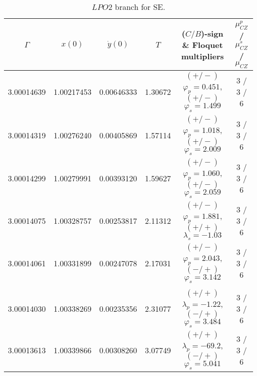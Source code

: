 \documentclass[reqno, 11pt]{amsart}
\theoremstyle{plain}
\theoremstyle{definition}
\theoremstyle{remark}
\begin{document}
\begin{table}[h]\fontsize{10}{10}\selectfont \centering
\caption{$LPO2$ branch for SE.}
	\begin{tabular}{c|c|c|c|c|c}
 \hline
		$\Gamma$ & $x(0)$ & $\dot{y}(0)$ & $T$ & ($C/B$)-sign \& Floquet multipliers & $\mu_{CZ}^p$ / $\mu_{CZ}^s$ / $\mu_{CZ}$\\
		\hline 3.00014639 & 1.00217453 & 0.00646333 & 1.30672 & $(+/-)$ $\varphi_p = 0.451$, $(+/-)$ $\varphi_s = 1.499$ & 3 / 3 / 6\\
        3.00014319 & 1.00276240 & 0.00405869 & 1.57114 & $(+/-)$ $\varphi_p = 1.018$, $(+/-)$ $\varphi_s = 2.009$ & 3 / 3 / 6\\
        3.00014299 & 1.00279991 & 0.00393120 & 1.59627 & $(+/-)$ $\varphi_p = 1.060$, $(+/-)$ $\varphi_s = 2.059$ & 3 / 3 / 6\\
        3.00014075 & 1.00328757 & 0.00253817 & 2.11312 & $(+/-)$ $\varphi_p = 1.881$, $(+/+)$ $\lambda_s = -1.03$ & 3 / 3 / 6\\
        3.00014061 & 1.00331899 & 0.00247078 & 2.17031 & $(+/-)$ $\varphi_p = 2.043$, $(-/+)$ $\varphi_s = 3.142$ & 3 / 3 / 6 \\
		  & & & & & \\
		3.00014030 & 1.00338269 & 0.00235356 & 2.31077 & $(+/+)$ $\lambda_p = -1.22$, $(-/+)$ $\varphi_s = 3.484$ & 3 / 3 / 6 \\
		3.00013613 & 1.00339866 & 0.00308260 & 3.07749 & $(+/+)$ $\lambda_p = -69.2$, $(-/+)$ $\varphi_s = 5.041$ & 3 / 3 / 6
	\end{tabular}
	\label{data_lpo2_s_e}
\end{table}
\end{document}
